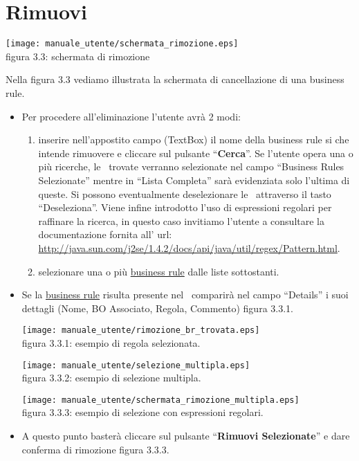 \section{Rimuovi \br}
\begin{center}
\texttt{[image: manuale\_utente/schermata\_rimozione.eps]}\\
 figura 3.3: schermata di rimozione
\end{center}
Nella figura 3.3 vediamo illustrata la schermata di cancellazione di una business rule.
\begin{itemize}
\item Per procedere all'eliminazione l'utente avr\`a 2 modi:
\begin{enumerate}
\item inserire nell'appostito campo (TextBox) il nome della business rule si che intende rimuovere e cliccare sul pulsante ``\textbf{Cerca}''. Se l'utente opera una o pi\`u ricerche, le \br\ trovate verranno selezionate nel campo ``Business Rules Selezionate'' mentre in ``Lista Completa'' sar\`a evidenziata solo l'ultima di queste. Si possono eventualmente deselezionare le \br\ attraverso il tasto ``Deseleziona''. Viene infine introdotto l'uso di espressioni regolari per raffinare la ricerca, in questo caso invitiamo l'utente a consultare la documentazione fornita all' url:\\ \href{http://java.sun.com/j2se/1.4.2/docs/api/java/util/regex/Pattern.html}{http://java.sun.com/j2se/1.4.2/docs/api/java/util/regex/Pattern.html}.
\item selezionare una o pi\`u \underline{business rule} dalle liste sottostanti.
\end{enumerate}

\item Se la \underline{business rule} risulta presente nel \rp\, comparir\`a  nel campo ``Details'' i suoi dettagli (Nome, BO Associato, Regola, Commento) figura 3.3.1. 

\begin{center}
\texttt{[image: manuale\_utente/rimozione\_br\_trovata.eps]}\\
 figura 3.3.1: esempio di regola selezionata.
\end{center} 

\begin{center}
\texttt{[image: manuale\_utente/selezione\_multipla.eps]}\\
 figura 3.3.2: esempio di selezione multipla.
\end{center} 

\begin{center}
\texttt{[image: manuale\_utente/schermata\_rimozione\_multipla.eps]}\\
 figura 3.3.3: esempio di selezione con espressioni regolari.
\end{center} 

\item A questo punto baster\`a cliccare sul pulsante ``\textbf{Rimuovi Selezionate}'' e dare conferma di rimozione figura 3.3.3.  
\end{itemize}

